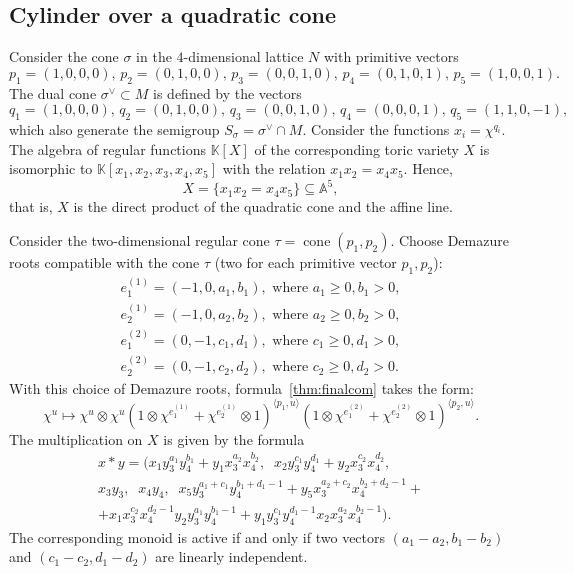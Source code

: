 \documentclass[a4paper, 11pt]{amsart}
\theoremstyle{plain}
\theoremstyle{remark}
\theoremstyle{definition}
\newcommand{\KK}{\mathbb{K}}
\DeclareMathOperator{\cone}{cone}
\begin{document}
\subsection{Cylinder over a quadratic cone} \label{example2}
Consider the cone $\sigma$ in the $4$-dimensional lattice $N$ with primitive vectors
\[p_1 = (1, 0, 0, 0), \, p_2 = (0, 1, 0, 0), \, p_3 = (0, 0, 1, 0), \, p_4 = (0, 1, 0, 1), \, p_5 = (1, 0, 0, 1).\] The dual cone $\sigma^\vee \subset M$ is defined by the vectors
\[q_1 = (1, 0, 0, 0), \, q_2 = (0, 1, 0, 0), \, q_3 = (0, 0, 1, 0), \, q_4 = (0, 0, 0, 1), \, q_5 = (1, 1, 0, -1),\] which also generate the semigroup $S_\sigma = \sigma^\vee \cap M$. Consider the functions $x_i = \chi^{q_i}$. The algebra of regular functions $\KK[X]$ of the corresponding toric variety $X$ is isomorphic to $\KK[x_1, x_2, x_3, x_4, x_5]$ with the relation $x_1x_2 = x_4x_5$. Hence, $$X = \{ x_1x_2 = x_4x_5 \} \subseteq \mathbb{A}^5,$$ that is, $X$ is the direct product of the quadratic cone and the affine line.

Consider the two-dimensional regular cone $\tau = \cone(p_1, p_2)$. Choose Demazure roots compatible with the cone $\tau$ (two for each primitive vector $p_1, p_2$):
\begin{equation*}
	\begin{gathered}
		e_1^{(1)} = (-1, 0, a_1, b_1), \text{ where } a_1 \geq 0, b_1 > 0,\\
		e_2^{(1)} = (-1, 0, a_2, b_2), \text{ where } a_2 \geq 0, b_2 > 0,\\
		e_1^{(2)} = (0, -1, c_1, d_1), \text{ where } c_1 \geq 0, d_1 > 0,\\
		e_2^{(2)} = (0, -1, c_2, d_2), \text{ where } c_2 \geq 0, d_2 > 0 .
	\end{gathered}
\end{equation*}
With this choice of Demazure roots, formula~\eqref{thm:finalcom} takes the form: $$\chi^u \mapsto \chi^u \otimes  \chi^u  (1 \otimes \chi^{e_1^{(1)}}  + \chi^{e_2^{(1)}} \otimes 1)^{\langle p_1, u\rangle} (1 \otimes \chi^{e_1^{(2)}}  + \chi^{e_2^{(2)}} \otimes 1)^{\langle p_2, u\rangle}. $$ 
The multiplication on $X$ is given by the formula
\begin{multline}\label{eq_mult_example2}
	x*y = \bigl(x_1 y_3^{a_1}y_4^{b_1} + y_1 x_3^{a_2}x_4^{b_2}, \;\; x_2 y_3^{c_1}y_4^{d_1} + y_2 x_3^{c_2}x_4^{d_2}, 
	\\ x_3 y_3, \;\; x_4 y_4, \;\;
	x_5y_3^{a_1 + c_1}y_4^{b_1 + d_1 - 1} 
	+ y_5x_3^{a_2 + c_2}x_4^{b_2 + d_2 - 1} +
	\\
	+ x_1 x_3^{c_2}x_4^{d_2 - 1}y_2 y_3^{a_1}y_4^{b_1 - 1} 
	+ y_1 y_3^{c_1}y_4^{d_1 - 1}x_2 x_3^{a_2}x_4^{b_2 - 1}\bigr).
\end{multline}
The corresponding monoid is active if and only if two vectors 
$(a_1 - a_2, b_1 - b_2)$ and ${(c_1 - c_2, d_1 - d_2)}$ are linearly independent.
\end{document}
